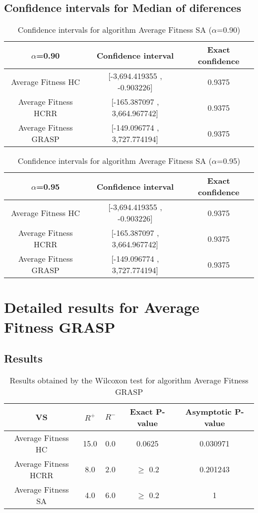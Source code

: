 \documentclass[a4paper,10pt]{article}
\begin{document}
\subsection{Confidence intervals for Median of diferences}

\begin{table}[!htp]
\centering\small
\begin{tabular}{
|c|c|c|}
\hline
 $\alpha$=0.90 & Confidence interval & Exact confidence \\ \hline 
Average Fitness HC & [-3,694.419355 , -0.903226] & 0.9375\\ \hline 
Average Fitness HCRR & [-165.387097 , 3,664.967742] & 0.9375\\ \hline 
Average Fitness GRASP & [-149.096774 , 3,727.774194] & 0.9375\\ \hline 

\end{tabular}
\caption{Confidence intervals for algorithm Average Fitness SA ($\alpha$=0.90)}
\end{table}
\begin{table}[!htp]
\centering\small
\begin{tabular}{
|c|c|c|}
\hline
 $\alpha$=0.95 & Confidence interval & Exact confidence \\ \hline 
Average Fitness HC & [-3,694.419355 , -0.903226] & 0.9375\\ \hline 
Average Fitness HCRR & [-165.387097 , 3,664.967742] & 0.9375\\ \hline 
Average Fitness GRASP & [-149.096774 , 3,727.774194] & 0.9375\\ \hline 

\end{tabular}
\caption{Confidence intervals for algorithm Average Fitness SA ($\alpha$=0.95)}
\end{table}

 \clearpage 


\section{Detailed results for Average Fitness GRASP}


\subsection{Results}

\begin{table}[!htp]
\centering\small
\begin{tabular}{
|c|c|c|c|c|}
\hline
 VS & $R^{+}$ & $R^{-}$ & Exact P-value & Asymptotic P-value \\ \hline 
Average Fitness HC & 15.0 & 0.0 & 0.0625 & 0.030971\\ \hline 
Average Fitness HCRR & 8.0 & 2.0 & $\geq$ 0.2 & 0.201243\\ \hline 
Average Fitness SA & 4.0 & 6.0 & $\geq$ 0.2 & 1\\ \hline 

\end{tabular}
\caption{Results obtained by the Wilcoxon test for algorithm Average Fitness GRASP}
\end{table}
\end{document}
